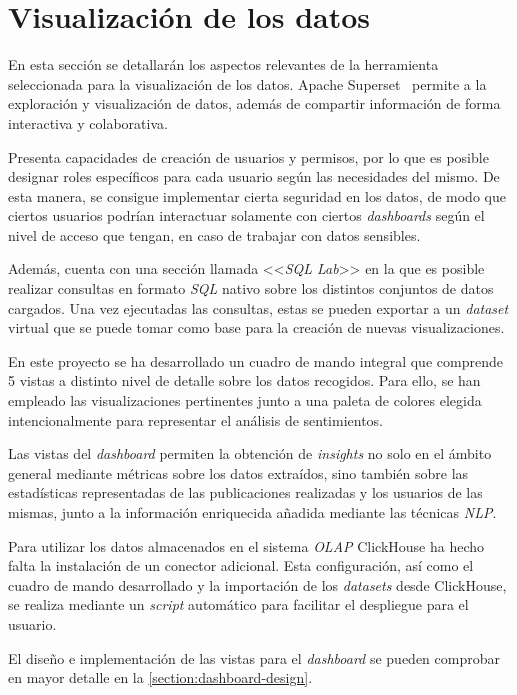 \section{Visualización de los datos}

En esta sección se detallarán los aspectos relevantes de la herramienta seleccionada para la visualización de los datos. Apache Superset~\cite{apacheSuperset} permite a la exploración y visualización de datos, además de compartir información de forma interactiva y colaborativa.

Presenta capacidades de creación de usuarios y permisos, por lo que es posible designar roles específicos para cada usuario según las necesidades del mismo. De esta manera, se consigue implementar cierta seguridad en los datos, de modo que ciertos usuarios podrían interactuar solamente con ciertos \textit{dashboards} según el nivel de acceso que tengan, en caso de trabajar con datos sensibles.

Además, cuenta con una sección llamada <<\textit{SQL Lab}>> en la que es posible realizar consultas en formato \textit{SQL} nativo sobre los distintos conjuntos de datos cargados. Una vez ejecutadas las consultas, estas se pueden exportar a un \textit{dataset} virtual que se puede tomar como base para la creación de nuevas visualizaciones.

En este proyecto se ha desarrollado un cuadro de mando integral que comprende 5 vistas a distinto nivel de detalle sobre los datos recogidos. Para ello, se han empleado las visualizaciones pertinentes junto a una paleta de colores elegida intencionalmente para representar el análisis de sentimientos.

Las vistas del \textit{dashboard} permiten la obtención de \textit{insights} no solo en el ámbito general mediante métricas sobre los datos extraídos, sino también sobre las estadísticas representadas de las publicaciones realizadas y los usuarios de las mismas, junto a la información enriquecida añadida mediante las técnicas \textit{NLP}. 

Para utilizar los datos almacenados en el sistema \textit{OLAP} ClickHouse ha hecho falta la instalación de un conector adicional. Esta configuración, así como el cuadro de mando desarrollado y la importación de los \textit{datasets} desde ClickHouse, se realiza mediante un \textit{script} automático para facilitar el despliegue para el usuario. 

El diseño e implementación de las vistas para el \textit{dashboard} se pueden comprobar en mayor detalle en la \autoref{section:dashboard-design}.


